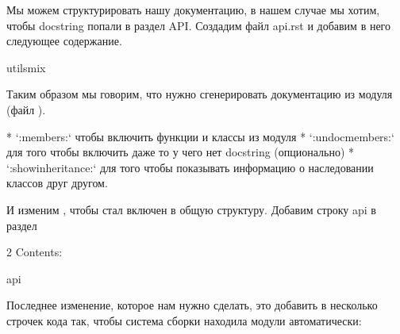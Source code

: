 \documentclass[letterpaper,10pt,russian]{sphinxmanual}
\begin{document}
\sphinxAtStartPar
Мы можем структурировать нашу документацию, в нашем случае мы хотим, чтобы docstring попали в раздел API. Создадим файл api.rst и добавим в него следующее содержание.

\begin{sphinxVerbatim}[commandchars=\\\{\}]

  utils\PYGZus{}mix
\end{sphinxVerbatim}

\sphinxAtStartPar
Таким образом мы говорим, что нужно сгенерировать документацию из модуля  (файл ).

\begin{sphinxVerbatim}[commandchars=\\\{\}]
* `:members:` чтобы включить функции и классы из модуля
* `:undoc\PYGZhy{}members:` для того чтобы включить даже то у чего нет docstring (опционально)
* `:show\PYGZhy{}inheritance:` для того чтобы показывать информацию о наследовании классов друг другом.
\end{sphinxVerbatim}

\sphinxAtStartPar
И изменим , чтобы  стал включен в общую структуру. Добавим строку api в раздел 

\begin{sphinxVerbatim}[commandchars=\\\{\}]
 
    2
    Contents:

   api
\end{sphinxVerbatim}

\sphinxAtStartPar
Последнее изменение, которое нам нужно сделать, это добавить в  несколько строчек кода так, чтобы система сборки находила модули автоматически:

\begin{sphinxVerbatim}[commandchars=\\\{\}]
 
 

 
\end{sphinxVerbatim}
\end{document}
